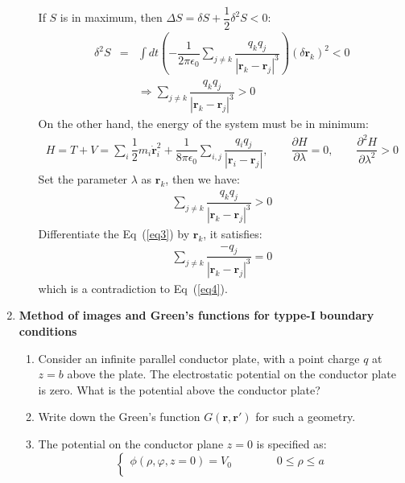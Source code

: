 \documentclass[a4paper,11pt]{article}
\begin{document}
\begin{enumerate}
\begin{enumerate}
        If $S$ is in maximum, then $\Delta S = \delta S + \dfrac{1}{2}\delta^2 S < 0$:
        \begin{eqnarray}
            \delta^2 S &=&\int dt \left(-\dfrac{1}{2\pi\epsilon_0}\sum\limits_{j\neq k}\dfrac{q_kq_j}{|\boldsymbol{r}_k-\boldsymbol{r}_j|^3}\right)(\delta \boldsymbol{r}_k)^2<0\nonumber \\
            &&\Longrightarrow \sum\limits_{j\neq k}\dfrac{q_kq_j}{|\boldsymbol{r}_k-\boldsymbol{r}_j|^3}>0
        \end{eqnarray}
        On the other hand, the energy of the system must be in minimum:
        \begin{eqnarray}
            H =T+V=\sum\limits_{i}\dfrac{1}{2}m_i\dot{\boldsymbol{r}}_i^2+\dfrac{1}{8\pi\epsilon_0}\sum\limits_{i,j}\dfrac{q_iq_j}{|\boldsymbol{r}_i-\boldsymbol{r}_j|},\quad\quad \dfrac{\partial H}{\partial\lambda}=0,\quad\quad \dfrac{\partial^2 H}{\partial\lambda^2}>0
        \end{eqnarray}
        Set the parameter $\lambda$ as $\boldsymbol{r}_k$, then we have:
        \begin{eqnarray}\label{eq4}
            \sum\limits_{j\neq k}\dfrac{q_kq_j}{|\boldsymbol{r}_k-\boldsymbol{r}_j|^3}>0
        \end{eqnarray}
        Differentiate the Eq~(\ref{eq3}) by $\boldsymbol{r}_k$, it satisfies:
        \begin{eqnarray}
            \sum\limits_{j\neq k}\dfrac{-q_j}{|\boldsymbol{r}_k-\boldsymbol{r}_j|^3}=0
        \end{eqnarray}
        which is a contradiction to Eq~(\ref{eq4}).
    \end{enumerate}
    \item \textbf{Method of images and Green's functions for typpe-I boundary conditions}
    \begin{enumerate}
        \item Consider an infinite parallel conductor plate, with a point charge $q$ at $z=b$ above the plate. The electrostatic potential on the conductor plate is zero. What is the potential above the conductor plate?
        \item Write down the Green's function $G(\boldsymbol{r},\boldsymbol{r}')$ for such a geometry.
        \item The potential on the conductor plane $z=0$ is specified as:
        \begin{equation}
            \begin{cases}
                \phi(\rho,\varphi,z=0)=V_0\quad\quad\quad\quad0\leqslant \rho\leqslant a \\

\end{cases}
\end{equation}
\end{enumerate}
\end{enumerate}
\end{document}
